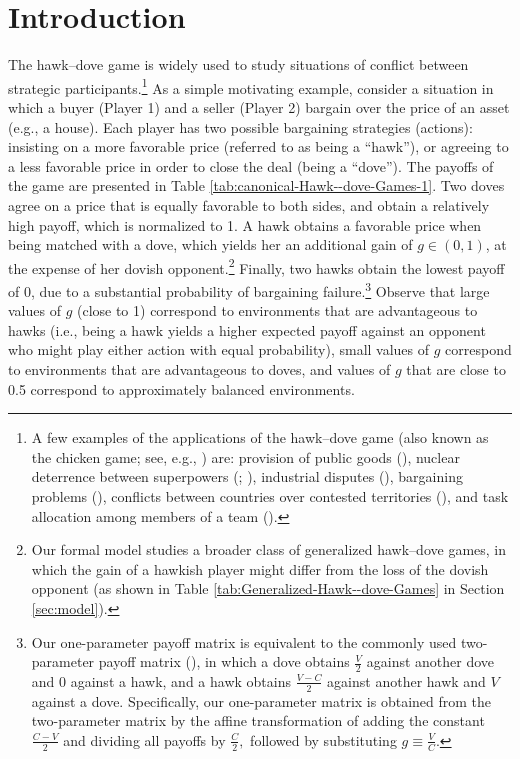 \documentclass[12pt]{article}
\numberwithin{equation}{section}
\numberwithin{figure}{section}
\theoremstyle{definition}
\theoremstyle{plain}
\theoremstyle{plain}
\theoremstyle{plain}
\theoremstyle{remark}
\theoremstyle{plain}
\theoremstyle{plain}
\begin{document}
\section{Introduction}
The hawk--dove game is 
widely used to study situations of conflict between strategic participants.\footnote{
A few examples of the applications of the hawk--dove game 
(also known as the chicken game; see, e.g., \citealp{rapoport1966game,aumann1987correlated}) are: provision of public goods (\citealp{lipnowski1983voluntary}), nuclear deterrence between superpowers (\citealp{brams1987threat};  \citealp{dixit2019we}), industrial disputes (\citealp{bornstein1997cooperation}), bargaining problems (\citealp{brams2001fallback}), conflicts between countries over contested territories (\citealp{baliga2012strategy,baliga2020strategy}), and task allocation among members of a team (\citealp{herold2020evolution}).}
As a simple motivating example,
consider a situation in which a buyer (Player 1) and a seller (Player 2) bargain over the price of an asset (e.g., a house). Each player has two possible bargaining strategies (actions): insisting on a more favorable price (referred to as being a ``hawk''), or agreeing to a less favorable price in order to close the deal (being a ``dove''). The payoffs of the game are presented in Table \ref{tab:canonical-Hawk--dove-Games-1}. 
Two doves agree on a price that is equally favorable to both sides, and obtain a relatively high payoff, which is normalized to 1. A hawk obtains a favorable price when being matched with a dove, which yields her an additional gain of $g\in(0,1)$, at the expense of her dovish opponent.\footnote{
Our formal model studies a broader class of generalized hawk--dove games, in which the gain of a hawkish player might differ from the loss of the dovish opponent (as shown in Table \ref{tab:Generalized-Hawk--dove-Games} in Section \ref{sec:model}).} 
 Finally, two hawks obtain the lowest payoff of 0, due to a substantial probability of bargaining failure.\footnote{
Our one-parameter payoff matrix is equivalent to the commonly used two-parameter payoff matrix (\citealp{smith1982evolution}), in which a dove obtains $\frac{V}{2}$ against another dove and 0 against a hawk, and a hawk obtains $\frac{V-C}{2}$ against another hawk and $V$ against a dove. Specifically, our one-parameter matrix is obtained from the two-parameter matrix by the affine transformation of adding the constant $\frac{C-V}{2}$ and dividing all payoffs by $\frac{C}{2},$ followed by substituting $g\equiv\frac{V}{C}.$}
 Observe that large values of $g$ (close to 1) correspond to environments that are advantageous to hawks (i.e., being a hawk yields a higher expected payoff against an opponent who might play either action with equal probability), small values of $g$ correspond to environments that are advantageous to doves, and values of $g$ that are close to 0.5 correspond to approximately balanced environments.
\end{document}
